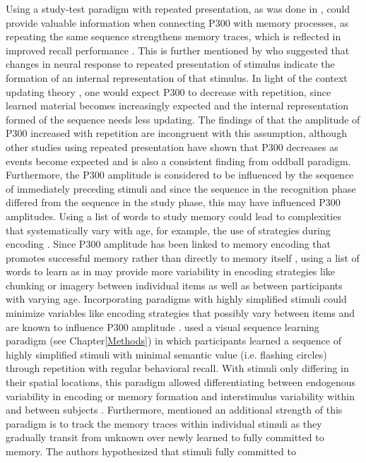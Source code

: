 Using a study-test paradigm with repeated presentation, as was done in \textcite{johnsonjr.P300LongTermMemory1985}, could provide valuable information when connecting P300 with memory processes, as repeating the same sequence strengthens memory traces, which is reflected in improved recall performance \parencite{hintzmanRepetitionMemoryEvidence1971}. This is further mentioned by \textcite{ruggEventrelatedPotentialsStimulus1994} who suggested that changes in neural response to repeated presentation of stimulus indicate the formation of an internal representation of that stimulus. In light of the context updating theory \parencite{donchinSurpriseSurprise1981}, one would expect P300 to decrease with repetition, since learned material becomes increasingly expected and the internal representation formed of the sequence needs less updating. The findings of \textcite{johnsonjr.P300LongTermMemory1985} that the amplitude of P300 increased with repetition are incongruent with this assumption, although other studies using repeated presentation have shown that P300 decreases as events become expected \parencite{courchesneChangesP3Waves1978} and is also a consistent finding from oddball paradigm. Furthermore, the P300 amplitude is considered to be influenced by the sequence of immediately preceding stimuli \parencite{squiresEffectStimulusSequence1976} and since the sequence in the recognition phase differed from the sequence in the study phase, this may have influenced P300 amplitudes.  Using a list of words to study memory could lead to complexities that systematically vary with age, for example, the use of strategies during encoding \parencite{schneiderDevelopmentYoungChildren2004}.  Since P300 amplitude has been linked to memory encoding that promotes successful memory rather than directly to memory itself \parencite{fernandezRealtimeTrackingMemory1999, polichUpdatingP300Integrative2007}, using a list of words to learn as in \textcite{johnsonjr.P300LongTermMemory1985} may provide more variability in encoding strategies like chunking \parencite{nogueiraLatePositiveSlow2015} or imagery \parencite{zahediImpactImageryStrategy2012} between individual items as well as between participants with varying age. Incorporating paradigms with highly simplified stimuli could minimize variables like encoding strategies that possibly vary between items and are known to influence P300 amplitude \parencite[e.g.,][]{karisP300MemoryIndividual1984}. \textcite{steinemannTrackingNeuralCorrelates2016} used a visual sequence learning paradigm (see Chapter\ref{Methods}) in which participants learned a sequence of highly simplified stimuli with minimal semantic value (i.e. flashing circles) through repetition with regular behavioral recall. With stimuli only differing in their spatial locations, this paradigm allowed differentiating between endogenous variability in encoding or memory formation and interstimulus variability within and between subjects \parencite{steinemannTrackingNeuralCorrelates2016}. Furthermore, \textcite{steinemannTrackingNeuralCorrelates2016} mentioned an additional strength of this paradigm is to track the memory traces within individual stimuli as they gradually transit from unknown over newly learned to fully committed to memory. The authors hypothesized that stimuli fully committed to 